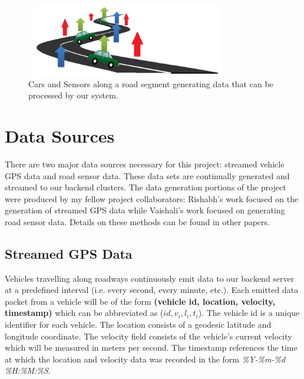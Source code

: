 \documentclass{vldb}
\begin{document}
\begin{figure}
\centering
\includegraphics[width=3.5in,height=1.25in]{Road}
\caption{Cars and Sensors along a road segment generating data that can be processed by our system.}
\label{fig:road}
\end{figure}

\section{Data Sources}
There are two major data sources necessary for this project: streamed vehicle GPS data and road sensor data. These data sets are continually generated and streamed to our backend clusters. The data generation portions of the project were produced by my fellow project collaborators: Rishabh’s work focused on the generation of streamed GPS data while Vaishali’s work focused on generating road sensor data. Details on these methods can be found in other papers. 

\subsection{Streamed GPS Data}
Vehicles travelling along roadways continuously emit data to our backend server at a predefined interval (i.e. every second, every minute, etc.). Each emitted data packet from a vehicle will be of the form \textbf{(vehicle id, location, velocity, timestamp)} which can be abbreviated as ($id, v_i, l_i, t_i$). The vehicle id is a unique identifier for each vehicle. The location consists of a geodesic latitude and longitude coordinate. The velocity field consists of the vehicle’s current velocity which will be measured in meters per second. The timestamp references the time at which the location and velocity data was recorded in the form \textit{\%Y-\%m-\%d \%H:\%M:\%S}.
\end{document}
